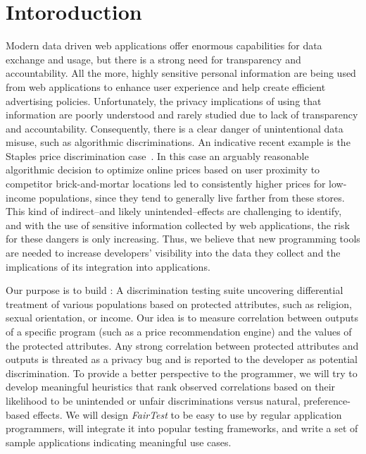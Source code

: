 
\section{Intoroduction}

Modern data driven web applications offer enormous capabilities for data
exchange and usage,
but there is a strong need for transparency and accountability.
All the more, highly sensitive personal information are being used from web
applications to enhance user experience and help create efficient advertising
policies. Unfortunately, the privacy implications of using that information are
poorly understood and rarely studied due to lack of transparency and
accountability. Consequently, there is a clear danger of unintentional data
misuse, such as algorithmic discriminations. An indicative recent
example is the Staples price discrimination case~\cite{Staples}.
In this case an arguably reasonable algorithmic decision to optimize online
prices based on user proximity to competitor brick-and-mortar locations led to
consistently higher prices for low-income populations, since they tend to
generally live farther from these stores. This kind of indirect--and likely
unintended--effects are challenging to identify, and with the use of sensitive
information collected by web applications, the risk for these dangers is only
increasing. Thus, we believe that new programming tools are needed to increase
developers’ visibility into the data they collect and the implications of its
integration into applications.

Our purpose is to build \thetool: A discrimination testing suite uncovering
differential treatment of various populations based on protected
attributes, such as religion, sexual orientation, or income. Our idea is to
measure correlation between outputs of a specific program (such as a price
recommendation engine) and the values of the protected attributes. Any strong
correlation between protected attributes and outputs is threated as a privacy
bug and is reported to the
developer as potential discrimination. To provide a better perspective to the
programmer, we will try to develop meaningful heuristics that rank observed
correlations based on their likelihood to be unintended or unfair
discriminations versus natural, preference-based effects. We will design
{\it FairTest} to be easy to use by regular application programmers,
will integrate
it into popular testing frameworks, and write a set of sample applications
indicating meaningful use cases.

